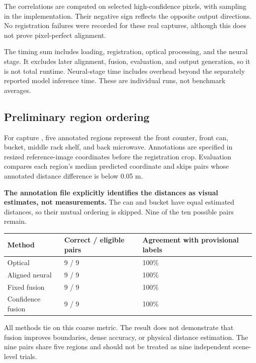 \documentclass[11pt]{article}
\begin{document}
The correlations are computed on selected high-confidence pixels, with sampling in the implementation. Their negative sign reflects the opposite output directions. No registration failures were recorded for these real captures, although this does not prove pixel-perfect alignment.

The timing sum includes loading, registration, optical processing, and the neural stage. It excludes later alignment, fusion, evaluation, and output generation, so it is not total runtime. Neural-stage time includes overhead beyond the separately reported model inference time. These are individual runs, not benchmark averages.

\subsection{Preliminary region ordering}

For capture , five annotated regions represent the front counter, front can, bucket, middle rack shelf, and back microwave. Annotations are specified in resized reference-image coordinates before the registration crop. Evaluation compares each region's median predicted coordinate and skips pairs whose annotated distance difference is below 0.05 m.

\textbf{The annotation file explicitly identifies the distances as visual estimates, not measurements.} The can and bucket have equal estimated distances, so their mutual ordering is skipped. Nine of the ten possible pairs remain.

\begin{center}\footnotesize\setlength{\tabcolsep}{3pt}
\begin{tabularx}{\textwidth}{XXX}
\toprule
Method & Correct / eligible pairs & Agreement with provisional labels \\
\midrule
Optical & 9 / 9 & 100\% \\
Aligned neural & 9 / 9 & 100\% \\
Fixed fusion & 9 / 9 & 100\% \\
Confidence fusion & 9 / 9 & 100\% \\
\bottomrule
\end{tabularx}\end{center}

All methods tie on this coarse metric. The result does not demonstrate that fusion improves boundaries, dense accuracy, or physical distance estimation. The nine pairs share five regions and should not be treated as nine independent scene-level trials.
\end{document}
